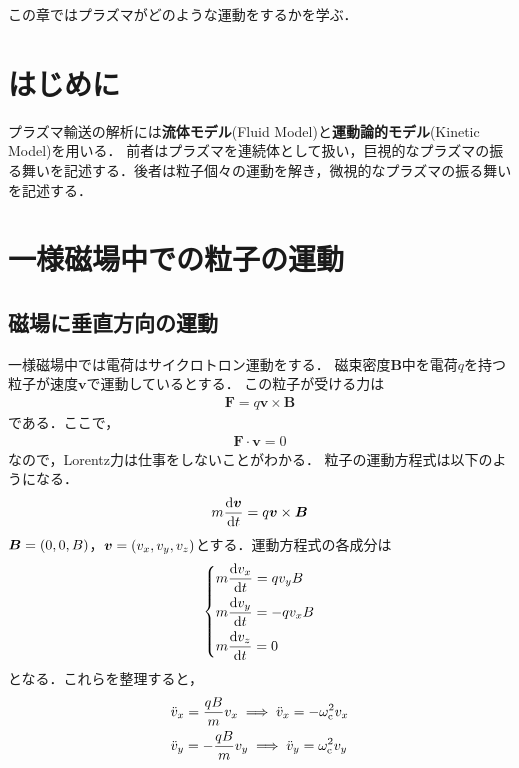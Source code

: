 \documentclass{report}
\begin{document}
  この章ではプラズマがどのような運動をするかを学ぶ．
  \section{はじめに}
    プラズマ輸送の解析には\textbf{流体モデル}(Fluid Model)と\textbf{運動論的モデル}(Kinetic Model)を用いる．
    前者はプラズマを連続体として扱い，巨視的なプラズマの振る舞いを記述する．後者は粒子個々の運動を解き，微視的なプラズマの振る舞いを記述する．
  \section{一様磁場中での粒子の運動}
    \subsection{磁場に垂直方向の運動}
      一様磁場中では電荷はサイクロトロン運動をする．
      磁束密度$\bm{B}$中を電荷$q$を持つ粒子が速度$\bm{v}$で運動しているとする．
      この粒子が受ける力は
      \begin{align}
        \bm{F} = q\bm{v}\times\bm{B}
      \end{align}
      である．ここで，
      \begin{align}
        \bm{F} \cdot \bm{v} = 0
      \end{align}
      なので，Lorentz力は仕事をしないことがわかる．
      粒子の運動方程式は以下のようになる．
      \begin{align}
        m \dv{\bm{v}}{t} = q\bm{v}\times\bm{B}
      \end{align}
      $\bm{B} = \qty(0, 0, B)$，$\bm{v} = \qty(v_x, v_y, v_z)$とする．運動方程式の各成分は
      \begin{align}
        \begin{dcases}
          m\dv{v_x}{t} = qv_yB \\
          m\dv{v_y}{t} = -qv_xB \\
          m\dv{v_z}{t} = 0
        \end{dcases}
      \end{align}
      となる．これらを整理すると，
      \begin{align}
        &\ddot{v}_x = \frac{qB}{m}v_x \implies \ddot{v}_x = - \omega_{\mathrm{c}}^2 v_x\\
        &\ddot{v}_y = -\frac{qB}{m}v_y \implies \ddot{v}_y = \omega_{\mathrm{c}}^2 v_y
      \end{align}
\end{document}
